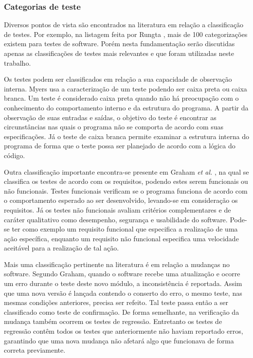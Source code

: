 \hypertarget{categorias-de-teste}{%
\subsubsection{Categorias de teste}\label{categorias-de-teste}}

Diversos pontos de vista são encontrados na literatura em relação a classificação de testes. Por exemplo, na listagem feita por Rungta \cite{rungta}, mais de 100 categorizações existem para testes de software. Porém nesta fundamentação serão discutidas apenas as classificações de testes mais relevantes e que foram utilizadas neste trabalho.

Os testes podem ser classificados em relação a sua capacidade de observação interna. Myers \cite{myers} usa a caracterização de um teste podendo ser caixa preta ou caixa branca. Um teste é considerado caixa preta quando não há preocupação com o conhecimento do comportamento interno e da estrutura do programa. A partir da observação de suas entradas e saídas, o objetivo do teste é encontrar as circunstâncias nas quais o programa não se comporta de acordo com suas especificações. Já o teste de caixa branca permite examinar a estrutura interna do programa de forma que o teste possa ser planejado de acordo com a lógica do código.

Outra classificação importante encontra-se presente em Graham \emph{et al.} \cite{graham}, na qual se classifica os testes de acordo com os requisitos, podendo estes serem funcionais ou não funcionais. Testes funcionais verificam se o programa funciona de acordo com o comportamento esperado ao ser desenvolvido, levando-se em consideração os requisitos. Já os testes não funcionais avaliam critérios complementares e de caráter qualitativo como desempenho, segurança e usabilidade do software. Pode-se ter como exemplo um requisito funcional que especifica a realização de uma ação específica, enquanto um requisito não funcional especifica uma velocidade aceitável para a realização de tal ação.

Mais uma classificação pertinente na literatura é em relação a mudanças no software. Segundo Graham, quando o software recebe uma atualização e ocorre um erro durante o teste deste novo módulo, a inconsistência é reportada. Assim que uma nova versão é lançada contendo o conserto do erro, o mesmo teste, nas mesmas condições anteriores, precisa ser refeito. Tal teste passa então a ser classificado como teste de confirmação. De forma semelhante, na verificação da mudança também ocorrem os testes de regressão. Entretanto os testes de regressão contêm todos os testes que anteriormente não haviam reportado erros, garantindo que uma nova mudança não afetará algo que funcionava de forma correta previamente.

